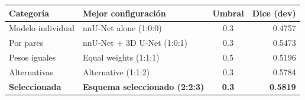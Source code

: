 \begin{tabular}{llcr}
\toprule
Categoría & Mejor configuración & Umbral & Dice (dev) \\
\midrule
Modelo individual & nnU-Net alone (1:0:0) & 0.3 & 0.4757 \\
Por pares & nnU-Net + 3D U-Net (1:0:1) & 0.3 & 0.5473 \\
Pesos iguales & Equal weights (1:1:1) & 0.5 & 0.5196 \\
Alternativas & Alternative (1:1:2) & 0.3 & 0.5784 \\
\bfseries Seleccionada & \bfseries Esquema seleccionado (2:2:3) & \bfseries 0.3 & \bfseries 0.5819 \\
\bottomrule
\end{tabular}%